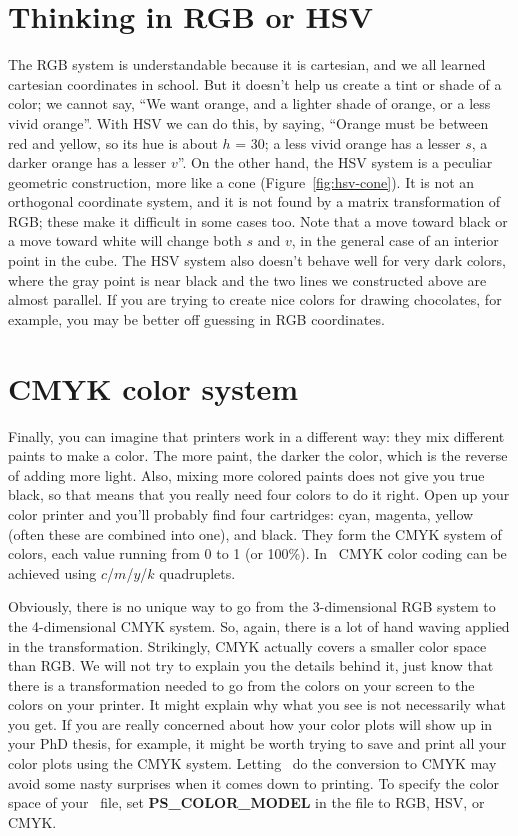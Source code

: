 \section{Thinking in RGB or HSV}
The RGB system is understandable because it is cartesian, and we all
learned cartesian coordinates in school.  But it doesn't help us
create a tint or shade of a color; we cannot say, ``We want orange,
and a lighter shade of orange, or a less vivid orange''.  With HSV we
can do this, by saying, ``Orange must be between red and yellow, so
its hue is about $h$ = 30\DS; a less vivid orange has a lesser
$s$, a darker orange has a lesser $v$''.  On the other hand,
the HSV system is a peculiar geometric construction, more like a cone (Figure~\ref{fig:hsv-cone}). It is not an
orthogonal coordinate system, and it is not found by a matrix
transformation of RGB; these make it difficult in some cases too.
Note that a move toward black or a move toward white will change both
$s$ and $v$, in the general case of an interior point in the
cube. The HSV system also doesn't behave well for very dark colors,
where the gray point is near black and the two lines we constructed
above are almost parallel.  If you are trying to create nice colors
for drawing chocolates, for example, you may be better off guessing
in RGB coordinates.

\section{CMYK color system}
Finally, you can imagine that printers work in a different way: they mix different paints to make a color. The more paint, the darker the color, which is the reverse of adding more light. Also, mixing more colored paints does not give you true black, so that means that you really need four colors to do it right. Open up your color printer and you'll probably find four cartridges: cyan, magenta, yellow (often these are combined into one), and black. They form the CMYK system of colors, each value running from 0 to 1 (or 100\%). In \GMT\ CMYK color coding can be achieved using $c$/$m$/$y$/$k$ quadruplets.

Obviously, there is no unique way to go from the 3-dimensional RGB system to the 4-dimensional CMYK system. So, again, there is a lot of hand waving applied in the transformation. Strikingly, CMYK actually covers a smaller color space than RGB. We will not try to explain you the details behind it, just know that there is a transformation needed to go from the colors on your screen to the colors on your printer. It might explain why what you see is not necessarily what you get. If you are really concerned about how your color plots will show up in your PhD thesis, for example, it might be worth trying to save and print all your color plots using the CMYK system. Letting \GMT\ do the conversion to CMYK may avoid
some nasty surprises when it comes down to printing. To specify the color space of your \PS\ file, set \textbf{PS\_COLOR\_MODEL}
in the  file to RGB, HSV, or CMYK.
